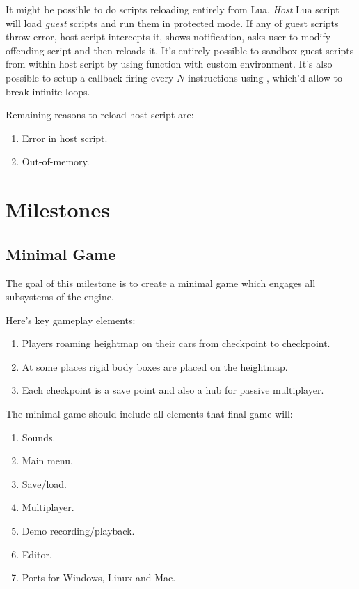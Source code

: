 \documentclass[12pt]{article}
\newcommand{\mylstinline}[2]{\fbox{\lstinline[language=#1]{#2}}}
\begin{document}
It might be possible to do scripts reloading entirely from Lua.
\emph{Host} Lua script will load \emph{guest} scripts and run them in
protected mode.
If any of guest scripts throw error, host script intercepts it,
shows notification, asks user to modify offending script and then
reloads it.
It's entirely possible to sandbox guest scripts from within
host script by using \mylstinline{bash}{load} function with custom
environment.
It's also possible to setup a callback firing every \(N\) instructions
using \mylstinline{bash}{debug.sethook}, which'd allow to break
infinite loops.

Remaining reasons to reload host script are:

\begin{enumerate}
    \item Error in host script.
    \item Out-of-memory.
\end{enumerate}

\section{Milestones}

\subsection{Minimal Game}

The goal of this milestone is to create a minimal game which engages all
subsystems of the engine.

Here's key gameplay elements:
\begin{enumerate}
    \item
        Players roaming heightmap on their cars from checkpoint to checkpoint.
    \item
        At some places rigid body boxes are placed on the heightmap.
    \item
        Each checkpoint is a save point and also a hub for passive multiplayer.
\end{enumerate}

The minimal game should include all elements that final game will:
\begin{enumerate}
    \item
        Sounds.
    \item
        Main menu.
    \item
        Save/load.
    \item
        Multiplayer.
    \item
        Demo recording/playback.
    \item
        Editor.
    \item
        Ports for Windows, Linux and Mac.
\end{enumerate}
\end{document}
